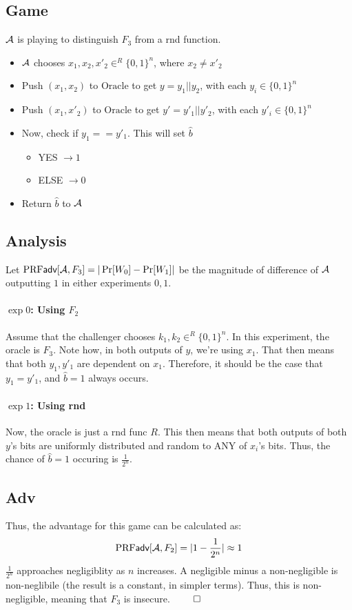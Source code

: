\documentclass[12pt]{article}
\theoremstyle{plain}
\theoremstyle{definition}
\begin{document}
\begin{problem}
\begin{solution}
\subsection*{Game}
$\mathcal{A}$ is playing to distinguish $F_3$ from a rnd function.
\begin{itemize}
  \item $\mathcal{A}$ chooses $x_1, x_2, x'_2 \in^R \{0, 1\}^n$, where $x_2 \neq x'_2$
  \item Push $(x_1, x_2)$ to $\text{Oracle}$ to get $y = y_1 || y_2$, with each $y_i \in \{0, 1\}^{n}$
  \item Push $(x_1, x'_2)$ to $\text{Oracle}$ to get $y' = y'_1 || y'_2$, with each $y'_i \in \{0, 1\}^{n}$
  \item Now, check if $y_1 == y'_1$. This will set $\hat{b}$
  \begin{itemize}
    \item YES $\to 1$
    \item ELSE $\to 0$
  \end{itemize}
  \item Return $\hat{b}$ to $\mathcal{A}$
\end{itemize}

\subsection*{Analysis}
Let $\textrm{PRF}\textsf{adv}[\mathcal{A}, F_3] = |\Pr[W_0] - \Pr[W_1]|$ be the magnitude of difference of $\mathcal{A}$ outputting $1$ in either experiments $0, 1$.

\paragraph{$\exp 0$: Using $F_2$}
Assume that the challenger chooses $k_1, k_2 \in^R \{0, 1\}^n$. In this experiment, the oracle is $F_3$. Note how, in both outputs of $y$, we're using $x_1$. That then means that both $y_1, y'_1$ are dependent on $x_1$. Therefore, it should be the case that $y_1 = y'_1$, and $\hat{b} = 1$ always occurs.

\paragraph{$\exp 1$: Using rnd}
Now, the oracle is just a rnd func $R$. This then means that both outputs of both $y$'s bits are uniformly distributed and random to ANY of $x_i$'s bits. Thus, the chance of $\hat{b} = 1$ occuring is $\frac{1}{2^n}$.

\subsection*{Adv}
Thus, the advantage for this game can be calculated as:
\begin{equation*}
  \textrm{PRF}\textsf{adv}[\mathcal{A}, F_2] = |1 - \frac{1}{2^n}| \approx 1
\end{equation*}
$\frac{1}{2^n}$ approaches negligiblity as $n$ increases. A negligible minus a non-negligible is non-neglibile (the result is a constant, in simpler terms). Thus, this is non-negligible, meaning that $F_3$ is insecure. $\qed$
\end{solution}



\end{problem}
\end{document}
